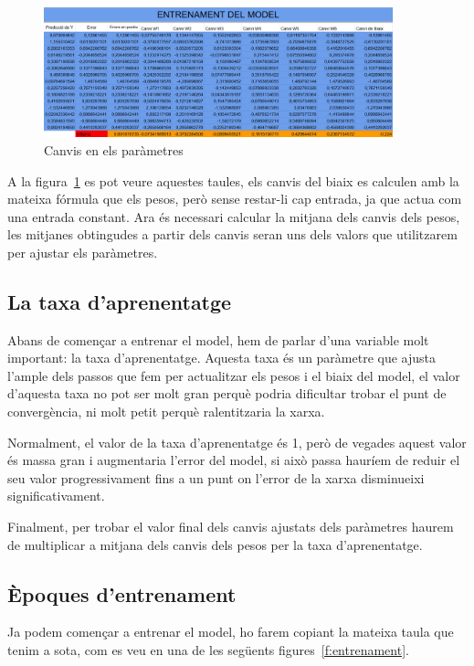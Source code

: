 \begin{figure}[h!]
    \centering
    \includegraphics[width=0.9\textwidth]{./figures/Canvis.png}
    \caption{Canvis en els paràmetres}
    \label{f:canvisParametres}
\end{figure}

A la figura~\ref{f:canvisParametres} es pot veure aquestes taules, els canvis del biaix es calculen amb la mateixa fórmula que els pesos, però sense restar-li cap entrada, ja que actua com una entrada constant.
Ara és necessari calcular la mitjana dels canvis dels pesos, les mitjanes obtingudes a partir dels canvis seran uns dels valors que utilitzarem per ajustar els paràmetres.

\subsection{La taxa d'aprenentatge}
Abans de començar a entrenar el model, hem de parlar d'una variable molt important: la taxa d'aprenentatge. Aquesta taxa és un paràmetre que ajusta l'ample dels passos que fem per actualitzar els pesos i el biaix del model, el valor d'aquesta taxa no pot ser molt gran perquè podria dificultar trobar el punt de convergència, ni molt petit perquè ralentitzaria la xarxa.

Normalment, el valor de la taxa d'aprenentatge és 1, però de vegades aquest valor és massa gran i augmentaria l'error del model, si això passa hauríem de reduir el seu valor progressivament fins a un punt on l'error de la xarxa disminueixi significativament.

Finalment, per trobar el valor final dels canvis ajustats dels paràmetres haurem de multiplicar a mitjana dels canvis dels pesos per la taxa d'aprenentatge.

\subsection{Èpoques d'entrenament}
Ja podem començar a entrenar el model, ho farem copiant la mateixa taula que tenim a sota, com es veu en una de les següents figures~\ref{f:entrenament}.

